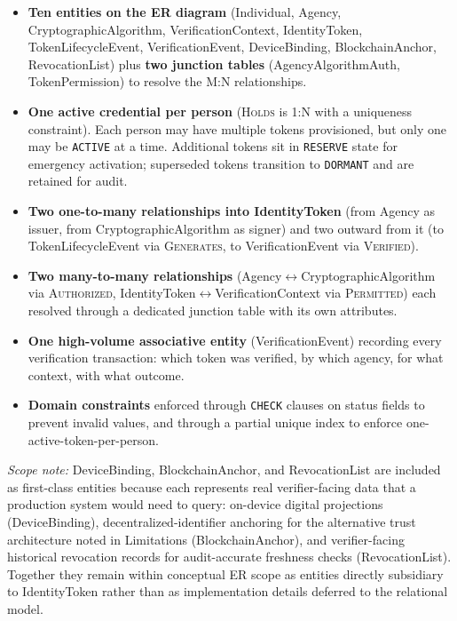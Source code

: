\documentclass[11pt,letterpaper]{article}
\begin{document}
\begin{itemize}
  \item \textbf{Ten entities on the ER diagram} (Individual, Agency, CryptographicAlgorithm, VerificationContext, IdentityToken, TokenLifecycleEvent, VerificationEvent, DeviceBinding, BlockchainAnchor, RevocationList) plus \textbf{two junction tables} (AgencyAlgorithmAuth, TokenPermission) to resolve the M:N relationships.
  \item \textbf{One active credential per person} (\textsc{Holds} is 1:N with a uniqueness constraint). Each person may have multiple tokens provisioned, but only one may be \texttt{ACTIVE} at a time. Additional tokens sit in \texttt{RESERVE} state for emergency activation; superseded tokens transition to \texttt{DORMANT} and are retained for audit.
  \item \textbf{Two one-to-many relationships into IdentityToken} (from Agency as issuer, from CryptographicAlgorithm as signer) and two outward from it (to TokenLifecycleEvent via \textsc{Generates}, to VerificationEvent via \textsc{Verified}).
  \item \textbf{Two many-to-many relationships} (Agency$\leftrightarrow$CryptographicAlgorithm via \textsc{Authorized}, IdentityToken$\leftrightarrow$VerificationContext via \textsc{Permitted}) each resolved through a dedicated junction table with its own attributes.
  \item \textbf{One high-volume associative entity} (VerificationEvent) recording every verification transaction: which token was verified, by which agency, for what context, with what outcome.
  \item \textbf{Domain constraints} enforced through \texttt{CHECK} clauses on status fields to prevent invalid values, and through a partial unique index to enforce one-active-token-per-person.
\end{itemize}

\textit{Scope note:} DeviceBinding, BlockchainAnchor, and RevocationList are included as first-class entities because each represents real verifier-facing data that a production system would need to query: on-device digital projections (DeviceBinding), decentralized-identifier anchoring for the alternative trust architecture noted in Limitations (BlockchainAnchor), and verifier-facing historical revocation records for audit-accurate freshness checks (RevocationList). Together they remain within conceptual ER scope as entities directly subsidiary to IdentityToken rather than as implementation details deferred to the relational model.
\end{document}
